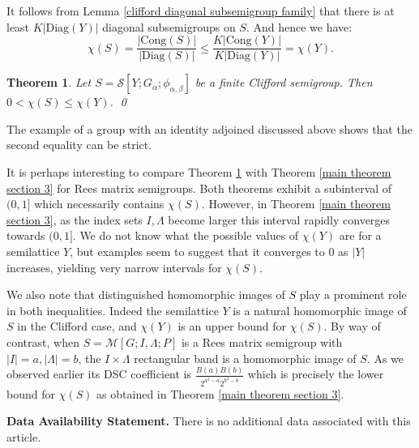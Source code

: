\documentclass[a4paper, 12pt,reqno]{amsart}
\theoremstyle{plain}
\newtheorem{thm}{Theorem}[section]
\theoremstyle{definition}
\theoremstyle{remark}
\newcommand{\RM}{\mathcal{M}[G;I,\Lambda;P]}
\newcommand{\Cong}{\text{Cong}}
\newcommand{\Diag}{\text{Diag}}
\begin{document}
It follows from Lemma \ref{clifford diagonal subsemigroup family} that there is at least $K |\Diag(Y)|$ diagonal subsemigroups on $S$.
And hence we have:
\begin{equation*}
    \chi(S) = \frac{|\Cong(S)|}{|\Diag(S)|} \leq \frac{K|\Cong(Y)|}{K|\Diag(Y)|} = \chi(Y).
\end{equation*}

\begin{thm}
    \label{Clifford Ratio Result}
    Let $S = \mathcal{S}[Y;G_\alpha ; \phi_{\alpha,\beta}]$ be a finite Clifford semigroup.
    Then ${0 < \chi(S) \leq \chi(Y)}$. \qed
\end{thm}

The example of a group with an identity adjoined discussed above shows that the second equality can be strict.

It is perhaps interesting to compare Theorem \ref{Clifford Ratio Result} with Theorem \ref{main theorem section 3} for Rees matrix semigroups.
Both theorems exhibit a subinterval of $(0,1]$ which necessarily contains $\chi(S)$. 
However, in Theorem \ref{main theorem section 3}, as the index sets $I,\Lambda$ become larger this interval rapidly converges towards $(0,1]$.
We do not know what the possible values of $\chi(Y)$ are for a semilattice $Y$, but examples seem to suggest that it converges to $0$ as $|Y|$ increases, yielding very narrow intervals for $\chi(S)$. 

We also note that distinguished homomorphic images of $S$ play a prominent role in both inequalities.
Indeed the semilattice $Y$ is a natural homomorphic image of $S$ in the Clifford case, and $\chi(Y)$ is an upper bound for $\chi(S)$.
By way of contrast, when $S= \RM$ is a Rees matrix semigroup with $|I| = a , |\Lambda| = b$, the $I \times \Lambda$ rectangular band is a homomorphic image of $S$.
As we observed earlier its DSC coefficient is $\frac{B(a)B(b)}{2^{a^2 - a}2^{b^2 - b}}$ which is precisely the lower bound for $\chi(S)$ as obtained in Theorem \ref{main theorem section 3}.
\bigskip

\textbf{Data Availability Statement.} There is no additional data associated with this article.



\end{document}
